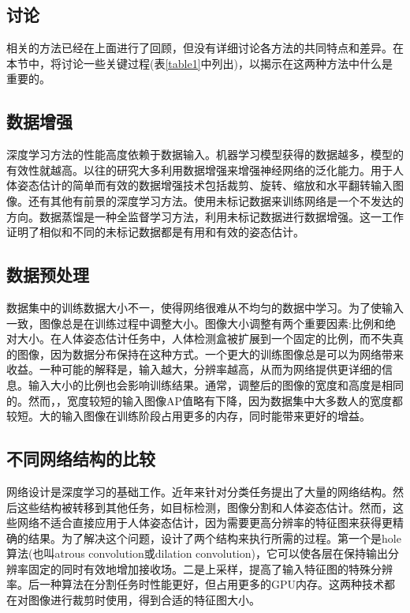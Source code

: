 \documentclass[hyperref]{ctexart}
\begin{document}
\begin{multicols}{2}
		\section{讨论}
		相关的方法已经在上面进行了回顾，但没有详细讨论各方法的共同特点和差异。在本节中，将讨论一些关键过程(表\ref{table1}中列出)，以揭示在这两种方法中什么是重要的。
		\subsection{数据增强}
		深度学习方法的性能高度依赖于数据输入。机器学习模型获得的数据越多，模型的有效性就越高。以往的研究大多利用数据增强来增强神经网络的泛化能力。用于人体姿态估计的简单而有效的数据增强技术包括裁剪、旋转、缩放和水平翻转输入图像。还有其他有前景的深度学习方法。使用未标记数据来训练网络是一个不发达的方向。数据蒸馏\cite{radosavovic2018data}是一种全监督学习方法，利用未标记数据进行数据增强。这一工作证明了相似和不同的未标记数据都是有用和有效的姿态估计。
		\subsection{数据预处理}
		数据集中的训练数据大小不一，使得网络很难从不均匀的数据中学习。为了使输入一致，图像总是在训练过程中调整大小。图像大小调整有两个重要因素:比例和绝对大小。在人体姿态估计任务中，人体检测盒被扩展到一个固定的比例，而不失真的图像，因为数据分布保持在这种方式。一个更大的训练图像总是可以为网络带来收益。一种可能的解释是，输入越大，分辨率越高，从而为网络提供更详细的信息。输入大小的比例也会影响训练结果。通常，调整后的图像的宽度和高度是相同的。然而，，宽度较短的输入图像AP值略有下降，因为数据集中大多数人的宽度都较短。大的输入图像在训练阶段占用更多的内存，同时能带来更好的增益。
		\subsection{不同网络结构的比较}
		网络设计是深度学习的基础工作。近年来针对分类任务提出了大量的网络结构\cite{xie2017aggregated}\cite{huang2017densely}。然后这些结构被转移到其他任务，如目标检测，图像分割和人体姿态估计。然而，这些网络不适合直接应用于人体姿态估计，因为需要更高分辨率的特征图来获得更精确的结果。为了解决这个问题，设计了两个结构来执行所需的过程。第一个是hole算法(也叫atrous convolution或dilation convolution)\cite{chen2017deeplab}，它可以使各层在保持输出分辨率固定的同时有效地增加接收场。二是上采样，提高了输入特征图的特殊分辨率。后一种算法在分割任务时性能更好，但占用更多的GPU内存。这两种技术都在对图像进行裁剪时使用，得到合适的特征图大小。
		

\end{multicols}
\end{document}
